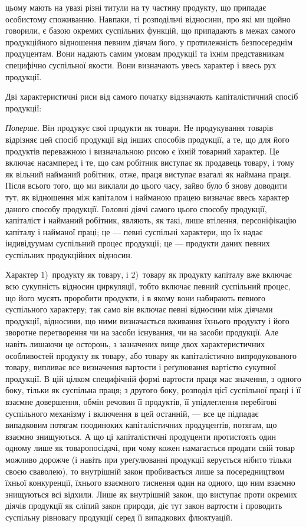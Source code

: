 \parcont{}  %
цьому мають на увазі різні титули на ту частину продукту, що припадає
особистому споживанню. Навпаки, ті розподільчі відносини, про які ми щойно
говорили, є базою окремих суспільних функцій, що припадають в межах самого
продукційного відношення певним діячам його, у протилежність безпосереднім
продуцентам. Вони надають самим умовам продукції та їхнім представникам специфічно
суспільної якости. Вони визначають увесь характер і ввесь рух продукції.

Дві характеристичні риси від самого початку відзначають капіталістичний
спосіб продукції:

\emph{Поперше}. Він продукує свої продукти як товари. Не продукування товарів
відрізняє цей спосіб продукції від інших способів продукції, а те, що для
його продуктів переважною і визначальною рисою є їхній товарний характер. Це
включає насамперед і те, що сам робітник виступає як продавець товару, і тому
як вільний найманий робітник, отже, праця виступає взагалі як наймана праця.
Після всього того, що ми виклали до цього часу, зайво було б знову доводити
тут, як відношення між капіталом і найманою працею визначає ввесь характер даного
способу продукції. Головні діячі самого цього способу продукції, капіталіст і
найманий робітник, являють, як такі, лише втілення, персоніфікацію капіталу і
найманої праці; це — певні суспільні характери, що їх надає індивідуумам суспільний
процес продукції; це — продукти даних певних суспільних продукційних
відносин.

Характер 1)~продукту як товару, і 2)~товару як продукту капіталу вже
включає всю сукупність відносин циркуляції, тобто включає певний суспільний
процес, що його мусять проробити продукти, і в якому вони набирають
певного суспільного характеру; так само він включає певні відносини між
діячами продукції, відносини, що ними визначається вживання їхнього продукту
і його зворотне перетворення чи на засоби існування, чи на засоби
продукції. Але навіть лишаючи це осторонь, з зазначених вище двох характеристичних
особливостей продукту як товару, або товару як капіталістично
випродукованого товару, випливає все визначення вартости і реґулювання вартістю
сукупної продукції. В цій цілком специфічній формі вартости праця має
значення, з одного боку, тільки як суспільна праця; з другого боку, розподіл
цієї суспільної праці і її взаємне довершення, обмін речовин її продуктів, її
упідлеглення перебігові суспільного механізму і включення в цей останній, —
все це підпадає випадковим потягам поодиноких капіталістичних продуцентів,
потягам, що взаємно знищуються. А що ці капіталістичні продуценти протистоять
один одному лише як товаропосідачі, при чому кожен намагається
продати свій товар можливо дорожче (і навіть при уреґулюванні продукції
керується нібито тільки своєю сваволею), то внутрішній закон пробивається
лише за посередництвом їхньої конкуренції, їхнього взаємного тиснення один
на одного, що ним взаємно знищуються всі відхили. Лише як внутрішній
закон, що виступає проти окремих діячів продукції як сліпий закон природи,
діє тут закон вартости і проводить суспільну рівновагу продукції серед її випадкових
флюктуацій.

